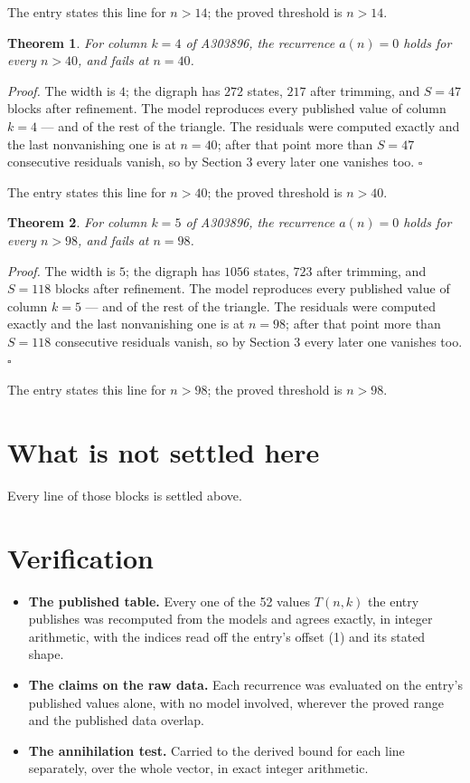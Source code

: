 \documentclass[11pt]{article}
\newtheorem{theorem}{Theorem}
\theoremstyle{definition}
\begin{document}
The entry states this line for $n > 14$; the proved threshold is $n > 14$.

\begin{theorem} For column $k = 4$ of A303896, the recurrence $a(n) = 0$ holds for every $n > 40$, and fails at $n = 40$.\end{theorem}

{\itshape Proof.} The width is $4$; the digraph has $272$ states, $217$ after trimming, and $S = 47$ blocks after refinement. The model reproduces every published value of column $k = 4$ --- and of the rest of the triangle. The residuals were computed exactly and the last nonvanishing one is at $n = 40$; after that point more than $S = 47$ consecutive residuals vanish, so by Section 3 every later one vanishes too. $\square$

The entry states this line for $n > 40$; the proved threshold is $n > 40$.

\begin{theorem} For column $k = 5$ of A303896, the recurrence $a(n) = 0$ holds for every $n > 98$, and fails at $n = 98$.\end{theorem}

{\itshape Proof.} The width is $5$; the digraph has $1056$ states, $723$ after trimming, and $S = 118$ blocks after refinement. The model reproduces every published value of column $k = 5$ --- and of the rest of the triangle. The residuals were computed exactly and the last nonvanishing one is at $n = 98$; after that point more than $S = 118$ consecutive residuals vanish, so by Section 3 every later one vanishes too. $\square$

The entry states this line for $n > 98$; the proved threshold is $n > 98$.

\section{What is not settled here}

Every line of those blocks is settled above.

\section{Verification}

\begin{itemize}

\item {\bfseries The published table.} Every one of the 52 values $T(n,k)$ the entry publishes was recomputed from the models and agrees exactly, in integer arithmetic, with the indices read off the entry's offset (1) and its stated shape.

\item {\bfseries The claims on the raw data.} Each recurrence was evaluated on the entry's published values alone, with no model involved, wherever the proved range and the published data overlap.

\item {\bfseries The annihilation test.} Carried to the derived bound for each line separately, over the whole vector, in exact integer arithmetic.

\end{itemize}
\end{document}
